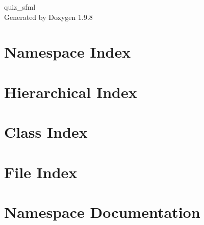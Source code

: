 \documentclass[twoside]{book}
\newcommand{\+}{\discretionary{\mbox{\scriptsize$\hookleftarrow$}}{}{}}
\newcommand{\clearemptydoublepage}{%
    \newpage{\pagestyle{empty}\cleardoublepage}%
  }
\begin{document}
  \raggedbottom
    \hypersetup{pageanchor=false,
                bookmarksnumbered=true,
                pdfencoding=unicode
               }
  \begin{titlepage}
  \vspace*{7cm}
  \begin{center}%
  {\Large quiz\+\_\+sfml}\\
  \vspace*{1cm}
  {\large Generated by Doxygen 1.9.8}\\
  \end{center}
  \end{titlepage}
  \clearemptydoublepage
  \tableofcontents
  \clearemptydoublepage
  \hypersetup{pageanchor=true}
\chapter{Namespace Index}

\chapter{Hierarchical Index}

\chapter{Class Index}

\chapter{File Index}

\chapter{Namespace Documentation}










\end{document}
